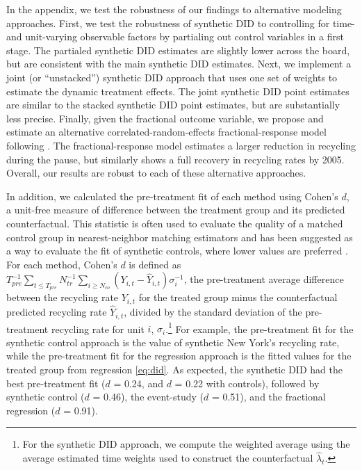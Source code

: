 \documentclass[12pt]{article}
\begin{document}
In the appendix, we test the robustness of our findings to alternative modeling approaches. First, we test the robustness of synthetic DID to controlling for time- and unit-varying observable factors by partialing out control variables in a first stage.  The partialed synthetic DID estimates are slightly lower across the board, but are consistent with the main synthetic DID estimates.  Next, we implement a joint (or ``unstacked'') synthetic DID approach that uses one set of weights to estimate the dynamic treatment effects.  The joint synthetic DID point estimates are similar to the stacked synthetic DID point estimates, but are substantially less precise.  Finally, given the fractional outcome variable, we propose and estimate an alternative correlated-random-effects fractional-response model following \cite{papkewooldridge2008}.  The fractional-response model estimates a larger reduction in recycling during the pause, but similarly shows a full recovery in recycling rates by 2005.  Overall, our results are robust to each of these alternative approaches.

In addition, we calculated the pre-treatment fit of each method using Cohen's \(d\), a unit-free measure of difference between the treatment group and its predicted counterfactual.  This statistic is often used to evaluate the quality of a matched control group in nearest-neighbor matching estimators and has been suggested as a way to evaluate the fit of synthetic controls, where lower values are preferred \citep{hollingsworth_wing_2020}. For each method, Cohen's \(d\) is defined as \(T_{pre}^{-1}\sum_{t\leq T_{pre}} N_{tr}^{-1}\sum_{i \geq N_{co}} (Y_{i,t}-\hat{Y}_{i,t})\sigma_i^{-1}\), the pre-treatment average difference between the recycling rate \(Y_{i,t}\) for the treated group minus the counterfactual predicted recycling rate \(\hat{Y}_{i,t}\), divided by the standard deviation of the pre-treatment recycling rate for unit \(i\), \(\sigma_i\).\footnote{For the synthetic DID approach, we compute the weighted average using the average estimated time weights used to construct the counterfactual \(\hat{\lambda}_t\).}  For example, the pre-treatment fit for the synthetic control approach is the value of synthetic New York's recycling rate, while the pre-treatment fit for the regression approach is the fitted values for the treated group from regression \ref{eq:did}.  As expected, the synthetic DID had the best pre-treatment fit (\(d\) = 0.24, and \(d\) = 0.22 with controls), followed by synthetic control (\(d\) = 0.46), the event-study (\(d\) = 0.51), and the fractional regression (\(d\) = 0.91).
\end{document}
